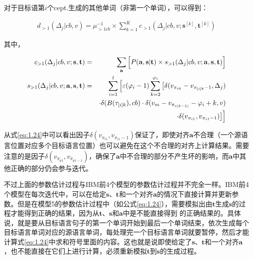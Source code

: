 \begin{appendices}
对于目标语第$i$个cept.生成的其他单词（非第一个单词），可以得到：

\begin{eqnarray}
d_{>1}(\Delta_j|cb,v) = \mu_{>1cb}^{-1} \times \sum_{k=1}^{K}c_{>1}(\Delta_j|cb,v;\mathbf{s}^{[k]},\mathbf{t}^{[k]})
\label{eq:1.26}
\end{eqnarray}

其中，

\begin{eqnarray}
c_{>1}(\Delta_j|cb,v;\mathbf{s},\mathbf{t})                   & =  & \sum_{\mathbf{a}}\Big[{P}(\mathbf{a},\mathbf{s}|\mathbf{t}) \times s_{>1}(\Delta_j|cb,v;\mathbf{a},\mathbf{s},\mathbf{t}) \Big] \label{eq:1.27} \\
s_{>1}(\Delta_j|cb,v;\mathbf{a},\mathbf{s},\mathbf{t}) & = & \sum_{i=1}^l\Big[\varepsilon(\varphi_i-1)\sum_{k=2}^{\varphi_i} \big[\delta(v_{\pi_{ik}}-v_{\pi_{[i]k}-1},\Delta_j)  \nonumber \\
                                                                                    &     & \cdot \delta(B(\tau_{[i]k}) ,cb) \cdot \delta(v_m-v_{\pi_{i(k-1)}}-\varphi_i+k,v) \nonumber \\
                                                                                    &     & \cdot \delta(v_{\pi_{i1}},v_{\pi_{i1}-1}) \big] \Big] \label{eq:1.28}
\end{eqnarray}

\vspace{0.5em}

\parinterval 从式\ref{eq:1.24}中可以看出因子$\delta(v_{\pi_{i1}},v_{\pi_{i1}-1})$保证了，即使对齐$\mathbf{a}$不合理（一个源语言位置对应多个目标语言位置）也可以避免在这个不合理的对齐上计算结果。需要注意的是因子$\delta(v_{\pi_{p1}},v_{\pi_{p1-1}})$，确保了$\mathbf{a}$中不合理的部分不产生坏的影响，而$\mathbf{a}$中其他正确的部分仍会参与迭代。

\parinterval 不过上面的参数估计过程与IBM前4个模型的参数估计过程并不完全一样。IBM前4个模型在每次迭代中，可以在给定$\mathbf{s}$、$\mathbf{t}$和一个对齐$\mathbf{a}$的情况下直接计算并更新参数。但是在模型5的参数估计过程中（如公式\ref{eq:1.24}），需要模拟出由$\mathbf{t}$生成$\mathbf{s}$的过程才能得到正确的结果，因为从$\mathbf{t}$、$\mathbf{s}$和$\mathbf{a}$中是不能直接得到 的正确结果的。具体说，就是要从目标语言句子的第一个单词开始到最后一个单词结束，依次生成每个目标语言单词对应的源语言单词，每处理完一个目标语言单词就要暂停，然后才能计算式\ref{eq:1.24}中求和符号里面的内容。这也就是说即使给定了$\mathbf{s}$、$\mathbf{t}$和一个对齐$\mathbf{a}$，也不能直接在它们上进行计算，必须重新模拟$\mathbf{t}$到$\mathbf{s}$的生成过程。


\end{appendices}
